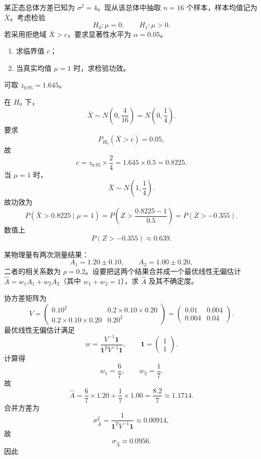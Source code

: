 \begin{question}
某正态总体方差已知为 $\sigma^2=4$。现从该总体中抽取 $n=16$ 个样本，样本均值记为 $\bar X$。考虑检验
\[
H_0:\mu=0,
\qquad
H_1:\mu>0.
\]
若采用拒绝域 $\bar X>c$，要求显著性水平为 $\alpha=0.05$。
\begin{enumerate}
\item 求临界值 $c$；
\item 当真实均值 $\mu=1$ 时，求检验功效。
\end{enumerate}
可取 $z_{0.95}=1.645$。
\begin{solution}
在 $H_0$ 下，
\[
\bar X\sim N\left(0,\frac{4}{16}\right)=N\left(0,\frac14\right).
\]
要求
\[
P_{H_0}(\bar X>c)=0.05,
\]
故
\[
c=z_{0.95}\times \frac{2}{4}=1.645\times 0.5=0.8225.
\]
当 $\mu=1$ 时，
\[
\bar X\sim N\left(1,\frac14\right).
\]
故功效为
\[
P(\bar X>0.8225\mid \mu=1)
=P\left(Z>\frac{0.8225-1}{0.5}\right)
=P(Z>-0.355).
\]
数值上
\[
P(Z>-0.355)\approx 0.639.
\]
\end{solution}
\end{question}

\begin{question}
某物理量有两次测量结果：
\[
A_1=1.20\pm 0.10,
\qquad
A_2=1.00\pm 0.20,
\]
二者的相关系数为 $\rho=0.2$。设要把这两个结果合并成一个最优线性无偏估计 $\hat A=w_1A_1+w_2A_2$（其中 $w_1+w_2=1$），求 $\hat A$ 及其不确定度。
\begin{solution}
协方差矩阵为
\[
V=\begin{pmatrix}
0.10^2 & 0.2\times 0.10\times 0.20\\
0.2\times 0.10\times 0.20 & 0.20^2
\end{pmatrix}
=
\begin{pmatrix}
0.01&0.004\\0.004&0.04
\end{pmatrix}.
\]
最优线性无偏估计满足
\[
w=\frac{V^{-1}\mathbf 1}{\mathbf 1^T V^{-1}\mathbf 1},
\qquad \mathbf 1=\begin{pmatrix}1\\1\end{pmatrix}.
\]
计算得
\[
w_1=\frac67,\qquad w_2=\frac17.
\]
故
\[
\hat A=\frac67\times 1.20+\frac17\times 1.00
=\frac{8.2}{7}\approx 1.1714.
\]
合并方差为
\[
\sigma_{\hat A}^2=\frac{1}{\mathbf 1^T V^{-1}\mathbf 1}\approx 0.00914,
\]
故
\[
\sigma_{\hat A}\approx 0.0956.
\]
因此
\end{solution}
\end{question}

